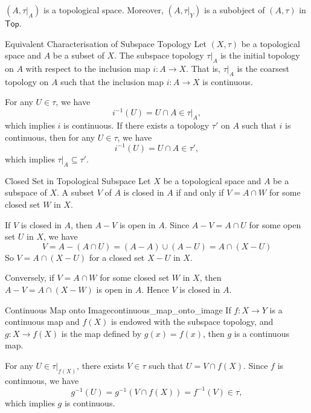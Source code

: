 \documentclass{report}
\newcommand{\Top}{\mathsf{Top}}
\begin{document}
$(A,\tau |_A)$ is a topological space. Moreover, $(A,\tau |_Y)$ is a subobject of $(A,\tau)$ in $\Top$.


\begin{proposition}{Equivalent Characterisation of Subspace Topology}{}
	Let $(X,\tau)$ be a topological space and $A$ be a subset of $X$. The subspace topology $\tau |_A$ is the initial topology on $A$ with respect to the inclusion map $i:A\to X$. That is, $\tau |_A$ is the coarsest topology on $A$ such that the inclusion map $i:A\to X$ is continuous.
\end{proposition}

\begin{prf}
	For any $U\in \tau$, we have
	\[
		i^{-1}(U)=U\cap A\in \tau|_A,
	\]
	which implies $i$ is continuous. If there exists a topology $\tau'$ on $A$ such that $i$ is continuous, then for any $U\in \tau$, we have
	\[
		i^{-1}(U)=U\cap A\in \tau',
	\]
	which implies $\tau|_A\subseteq \tau'$.
\end{prf}

\begin{proposition}{Closed Set in Topological Subspace}{}
	Let $X$ be a topological space and $A$ be a subspace of $X$. A subset $V$ of $A$ is closed in $A$ if and only if $V=A\cap W$ for some closed set $W$ in $X$.
\end{proposition}
\begin{prf}
	If $V$ is closed in $A$, then $A-V$ is open in $A$. Since $A-V=A\cap U$ for some open set $U$ in $X$, we have 
	\[
		V=A-\left(A\cap U\right)=(A-A)\cup \left(A-U\right)=A\cap (X-U)
	\]
	So $V=A\cap (X-U)$ for a closed set $X-U$ in $X$.

	Conversely, if $V=A\cap W$ for some closed set $W$ in $X$, then $A-V=A\cap (X-W)$ is open in $A$. Hence $V$ is closed in $A$.
\end{prf}

\begin{proposition}{Continuous Map onto Image}{continuous_map_onto_image}
	If $f:X\to Y$ is a continuous map and $f(X)$ is endowed with the subspace topology, and $g:X\to f(X)$ is the map defined by $g(x)=f(x)$, then $g$ is a continuous map.
\end{proposition}

\begin{prf}
	For any $U\in \tau|_{f(X)}$, there exists $V\in \tau$ such that $U=V\cap f(X)$. Since $f$ is continuous, we have
	\[
		g^{-1}(U)=g^{-1}\left(V\cap f(X)\right)=f^{-1}(V)\in \tau,
	\]
	which implies $g$ is continuous.
\end{prf}
\end{document}
